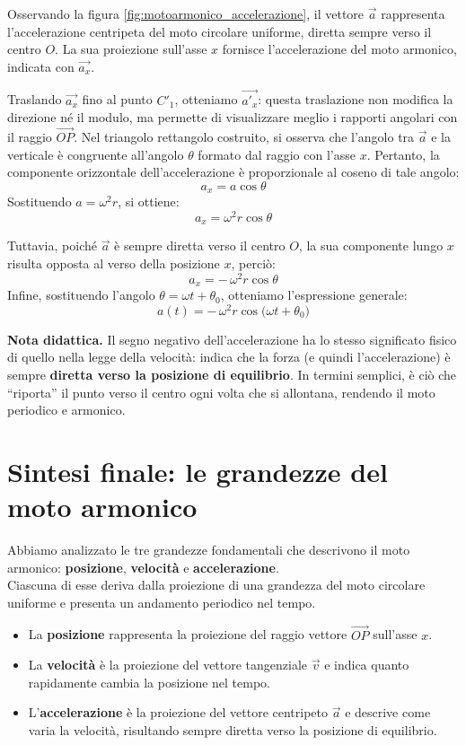 \documentclass[a4paper,12pt]{article}
\begin{document}
Osservando la figura \ref{fig:motoarmonico_accelerazione}, il vettore $\vec{a}$ rappresenta l’accelerazione centripeta del moto circolare uniforme, diretta sempre verso il centro $O$.  
La sua proiezione sull’asse $x$ fornisce l’accelerazione del moto armonico, indicata con $\vec{a_x}$.

Traslando $\vec{a_x}$ fino al punto $C'_1$, otteniamo $\vec{a'_x}$: questa traslazione non modifica la direzione né il modulo, ma permette di visualizzare meglio i rapporti angolari con il raggio $\overrightarrow{OP}$.  
Nel triangolo rettangolo costruito, si osserva che l’angolo tra $\vec{a}$ e la verticale è congruente all’angolo $\theta$ formato dal raggio con l’asse $x$.  
Pertanto, la componente orizzontale dell’accelerazione è proporzionale al coseno di tale angolo:
\[
a_x = a \cos\theta
\]
Sostituendo $a = \omega^2 r$, si ottiene:
\[
a_x = \omega^2 r \cos\theta
\]

Tuttavia, poiché $\vec{a}$ è sempre diretta verso il centro $O$, la sua componente lungo $x$ risulta opposta al verso della posizione $x$, perciò:
\[
a_x = -\,\omega^2 r \cos\theta
\]
Infine, sostituendo l’angolo $\theta = \omega t + \theta_0$, otteniamo l’espressione generale:
\[
\boxed{\,a(t) = -\,\omega^2 r \cos\!\big(\omega t + \theta_0\big)\,}
\]

\bigskip
\noindent
\textbf{Nota didattica.}  
Il segno negativo dell’accelerazione ha lo stesso significato fisico di quello nella legge della velocità: indica che la forza (e quindi l’accelerazione) è sempre \textbf{diretta verso la posizione di equilibrio}.  
In termini semplici, è ciò che “riporta” il punto verso il centro ogni volta che si allontana, rendendo il moto periodico e armonico.

\section{Sintesi finale: le grandezze del moto armonico}

Abbiamo analizzato le tre grandezze fondamentali che descrivono il moto armonico:   
\textbf{posizione}, \textbf{velocità} e \textbf{accelerazione}.  
\\Ciascuna di esse deriva dalla proiezione di una grandezza del moto circolare uniforme e presenta un andamento periodico nel tempo.

\begin{itemize}
  \item La \textbf{posizione} rappresenta la proiezione del raggio vettore $\overrightarrow{OP}$ sull’asse $x$.
  \item La \textbf{velocità} è la proiezione del vettore tangenziale $\vec{v}$ e indica quanto rapidamente cambia la posizione nel tempo.
  \item L’\textbf{accelerazione} è la proiezione del vettore centripeto $\vec{a}$ e descrive come varia la velocità, risultando sempre diretta verso la posizione di equilibrio.
\end{itemize}
\end{document}
